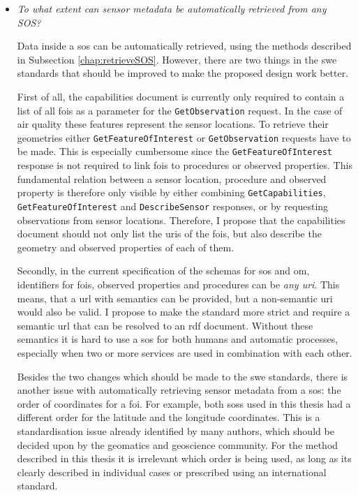 \begin{itemize}
\item \textit{To what extent can sensor metadata be automatically retrieved from any SOS?}%

Data inside a \ac{sos} can be automatically retrieved, using the methods described in Subsection \ref{chap:retrieveSOS}. However, there are two things in the \ac{swe} standards that should be improved to make the proposed design work better. 

\begin{sloppypar}
	First of all, the capabilities document is currently only required to contain a list of all \acp{foi} as a parameter for the \texttt{GetObservation} request. In the case of air quality these features represent the sensor locations. To retrieve their geometries either \texttt{GetFeatureOfInterest} or \texttt{GetObservation} requests have to be made. This is especially cumbersome since the \texttt{GetFeatureOfInterest} response is not required to link \acp{foi} to procedures or observed properties. This fundamental relation between a sensor location, procedure and observed property is therefore only visible by either combining \texttt{GetCapabilities}, \texttt{GetFeatureOfInterest} and \texttt{DescribeSensor} responses, or by requesting observations from sensor locations. Therefore, I propose that the capabilities document should not only list the \acp{uri} of the \acp{foi}, but also describe the geometry and observed properties of each of them. 
\end{sloppypar}

Secondly, in the current specification of the  schemas for \ac{sos} and \ac{om}, identifiers for \acp{foi}, observed properties and procedures can be \textit{any \ac{uri}}. This means, that a \ac{url} with semantics can be provided, but a non-semantic \ac{uri} would also be valid. I propose to make the standard more strict and require a semantic \ac{url} that can be resolved to an \ac{rdf} document. Without these semantics it is hard to use a \ac{sos} for both humans and automatic processes, especially when two or more services are used in combination with each other. 

Besides the two changes which should be made to the \ac{swe} standards, there is another issue with automatically retrieving sensor metadata from a \ac{sos}: the order of coordinates for a \ac{foi}. For example, both \aclp{sos} used in this thesis had a different order for the latitude and the longitude coordinates. This is a standardisation issue already identified by many authors, which should be decided upon by the geomatics and geoscience community. For the method described in this thesis it is irrelevant which order is being used, as long as its clearly described in individual cases or prescribed using an international standard.


\end{itemize}
